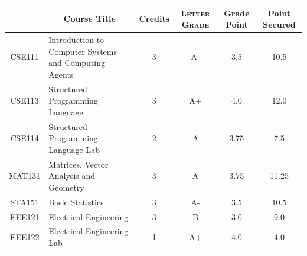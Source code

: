 \documentclass[11pt]{article}
\newcommand*{\numtwo}[1]{\pgfmathprintnumber[
                    fixed, precision=2, fixed zerofill=true]{#1}}
\begin{document}
                \begin{center}
                    \renewcommand{\arraystretch}{1.08}
                    
                \begin{tabular}{|c|l|c|>{\scshape}c|c|c|}
                \hline  \rule[-1ex]{0pt}{3.5ex} {\centering{\bf Course Code}} &  \multicolumn{1}{c|}{\textbf{Course Title}}  & {\bf Credits} & {\bf Letter Grade} & {\bf Grade Point} & {\bf Point Secured}  \\ 
                \hline   CSE111 &  Introduction to Computer Systems and Computing Agents		 & 3 & A- & 3.5 & 10.5 \\ %
                \hline   CSE113 &  Structured Programming Language		 & 3 & A+ & 4.0 & 12.0 \\ %
                \hline   CSE114 &  Structured Programming Language Lab		 & 2 & A & 3.75 & 7.5 \\ %
                \hline   MAT131 &  Matrices, Vector Analysis and Geometry		 & 3 & A & 3.75 & 11.25 \\ %
                \hline   STA151 &  Basic Statistics		 & 3 & A- & 3.5 & 10.5 \\ %
                \hline   EEE121 &  Electrical Engineering		 & 3 & B & 3.0 & 9.0 \\ %
                \hline   EEE122 &  Electrical Engineering Lab		 & 1 & A+ & 4.0 & 4.0 \\ %

\hline                %
                \end{tabular}
                \end{center}
                \renewcommand{\arraystretch}{1.03}
\end{document}
